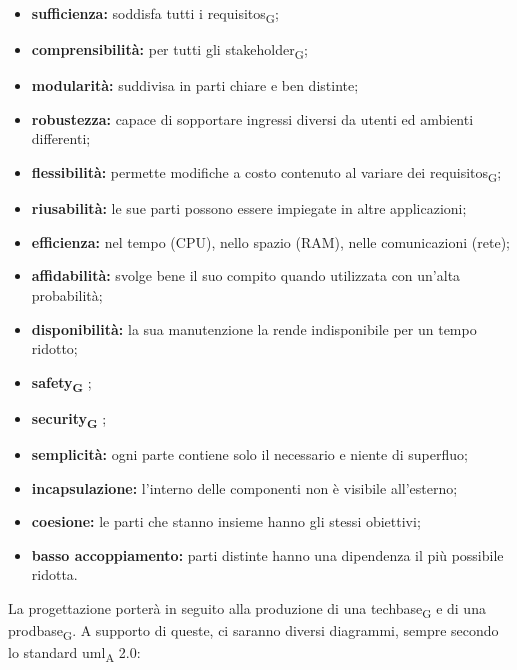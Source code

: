                 \begin{itemize}
                    \item \textbf{sufficienza: }soddisfa tutti i \glspl{requisito}\textsubscript{G};
                    \item \textbf{comprensibilità: }per tutti gli \gls{stakeholder}\textsubscript{G};
                    \item \textbf{modularità: }suddivisa in parti chiare e ben distinte;
                    \item \textbf{robustezza: }capace di sopportare ingressi diversi da utenti ed ambienti differenti;
                    \item \textbf{flessibilità: }permette modifiche a costo contenuto al variare dei \glspl{requisito}\textsubscript{G};
                    \item \textbf{riusabilità: }le sue parti possono essere impiegate in altre applicazioni;
                    \item \textbf{efficienza: }nel tempo (CPU), nello spazio (RAM), nelle comunicazioni (rete);
                    \item \textbf{affidabilità: }svolge bene il suo compito quando utilizzata con un'alta probabilità;
                    \item \textbf{disponibilità: }la sua manutenzione la rende indisponibile per un tempo ridotto;
                    \item \textbf{ \gls{safety}\textsubscript{G} };
                    \item \textbf{ \gls{security}\textsubscript{G} };
                    \item \textbf{semplicità: }ogni parte contiene solo il necessario e niente di superfluo;
                    \item \textbf{incapsulazione: }l'interno delle componenti non è visibile all'esterno;
                    \item \textbf{coesione: }le parti che stanno insieme hanno gli stessi obiettivi;
                    \item \textbf{basso accoppiamento: }parti distinte hanno una dipendenza il più possibile ridotta.
                \end{itemize}
                La progettazione porterà in seguito alla produzione di una \gls{techbase}\textsubscript{G} e di una \gls{prodbase}\textsubscript{G}. A supporto di queste, ci saranno diversi diagrammi, sempre secondo lo standard \acrshort{uml}\textsubscript{A} 2.0:

